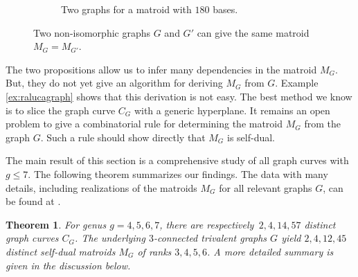 \documentclass[12pt]{extarticle}
\newtheorem{theorem}{Theorem}
\theoremstyle{definition}
\numberwithin{theorem}{section}
\theoremstyle{plain}\newtheorem{ithm}{Theorem}
\begin{document}
\begin{figure}[h]
\begin{subfigure}[b]{.45\textwidth}
\begin{subfigure}[c]{.45\textwidth}
    \end{subfigure}
    \caption{Two graphs for a matroid with $180$ bases.}
  \end{subfigure}
  \caption{Two non-isomorphic graphs 
  $G$ and $G'$ can give the same matroid $M_G = M_{G'}$.}\label{fig:diffgraphs}
\end{figure}

The two propositions  allow us to infer many dependencies in the
matroid $M_G$. But, they do not yet give an algorithm for
deriving $M_G$ from $G$.
Example \ref{ex:ralucagraph} shows that this derivation is not easy.
The best method we know is to  slice the
graph curve $C_G$ with  a generic hyperplane. It remains an open problem
  to give a combinatorial rule for determining 
  the matroid $M_G$  from the graph $G$.
  Such a rule should show directly that $M_G$ is self-dual.


The main result of this section is a comprehensive
study of all graph curves with $g \leq 7$. The following theorem
summarizes our findings. The data with many details, including
realizations of the matroids $M_G$ for all relevant graphs $G$, can be found at \cite{MathRepo}.

\begin{theorem} \label{thm:graphcurves4567}
  For genus $g=4,5,6,7$, there are respectively $\,2,4,14,57$ distinct graph curves $C_G$.
  The underlying $3$-connected trivalent graphs $G$ yield $2,4,12,45$ distinct self-dual matroids $M_G$ of
  ranks $3,4,5,6$.
  A more detailed summary is given in the discussion below.
\end{theorem}
\end{document}
